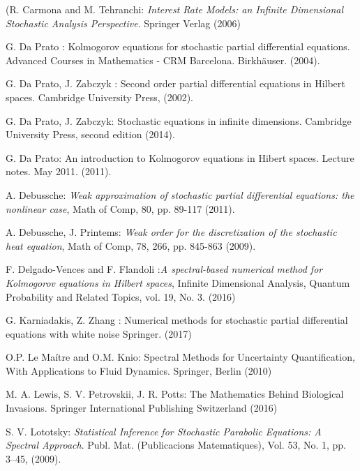 \documentclass{article}
\numberwithin{equation}{section}
\begin{document}
\vspace*{-0.2cm}
\begin{thebibliography}{99}


 (R. Carmona and M. Tehranchi: {\it Interest Rate Models: an Infinite Dimensional Stochastic Analysis Perspective}. Springer Verlag (2006)

 G. Da Prato : Kolmogorov equations for stochastic partial differential equations.
Advanced Courses in Mathematics - CRM Barcelona. Birkh\"auser. (2004).
 
  G. Da Prato, J. Zabczyk : Second order partial differential equations in Hilbert spaces.
 Cambridge University Press, (2002).

  G. Da Prato, J. Zabczyk: Stochastic equations in infinite dimensions.
Cambridge University Press, second edition (2014).

 G. Da Prato: An introduction to Kolmogorov equations in Hibert spaces. Lecture notes. May 2011. (2011).

 A. Debussche: {\it Weak approximation of stochastic partial differential equations: the nonlinear case}, Math of Comp, 80, 
pp. 89-117 (2011).

 A. Debussche, J. Printems: {\it Weak order for the discretization of the stochastic heat equation},
Math of Comp, 78, 266, pp. 845-863 (2009).

 F. Delgado-Vences  and F. Flandoli :{\it A spectral-based numerical method for Kolmogorov equations in Hilbert spaces},  Infinite Dimensional Analysis, Quantum Probability and Related Topics, vol. 19, No. 3. (2016)

 G. Karniadakis, Z. Zhang : Numerical methods for stochastic partial differential equations with white noise
 Springer. (2017)

  O.P. Le Ma\'itre and  O.M. Knio: Spectral Methods for Uncertainty
Quantification, With Applications to Fluid Dynamics.
Springer, Berlin (2010)

 M. A. Lewis, S. V. Petrovskii, J. R. Potts: The Mathematics Behind Biological Invasions. 
 Springer International Publishing Switzerland (2016)
 
 S. V. Lototsky: {\it Statistical Inference for Stochastic Parabolic Equations: A Spectral Approach}. Publ. Mat. 
(Publicacions Matematiques), Vol. 53, No. 1, pp. 3–45, (2009).


\end{thebibliography}
\end{document}

